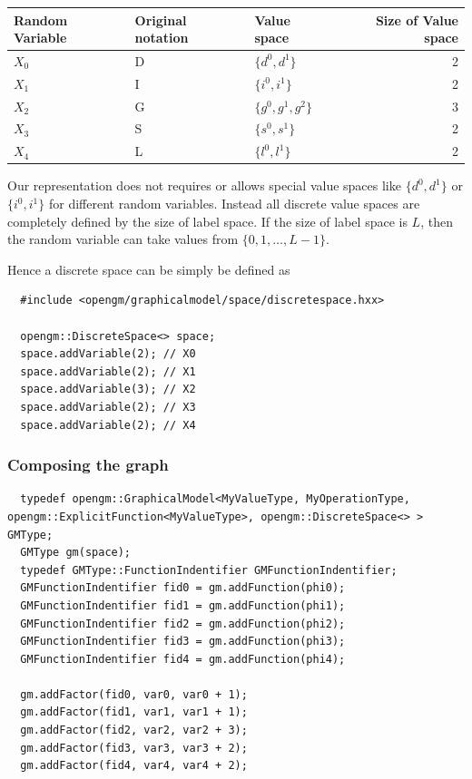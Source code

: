 \documentclass[12pt,oneside,letterpaper]{article}
\begin{document}
\begin{tabular}{|l|l|l|r|}
  \hline
  Random Variable & Original notation & Value space & Size of Value space \\
  \hline
  $X_0$ & D & $\{d^0, d^1\}$ & 2\\
  $X_1$ & I & $\{i^0, i^1\}$ & 2\\
  $X_2$ & G & $\{g^0, g^1, g^2\}$ & 3\\
  $X_3$ & S & $\{s^0, s^1\}$ & 2\\
  $X_4$ & L & $\{l^0, l^1\}$ & 2\\
  \hline
\end{tabular}

Our representation does not requires or allows special value spaces like
$\{d^0, d^1\}$ or $\{i^0, i^1\}$ for different random variables. 
Instead all discrete value spaces are completely defined by the size of label
space. If the size of label space is $L$, then the random variable can take
values from $\{0, 1, \dots, L - 1\}$.

Hence a discrete space can be simply be defined as 

\begin{lstlisting}
  #include <opengm/graphicalmodel/space/discretespace.hxx>

  opengm::DiscreteSpace<> space;
  space.addVariable(2); // X0
  space.addVariable(2); // X1
  space.addVariable(3); // X2
  space.addVariable(2); // X3
  space.addVariable(2); // X4
\end{lstlisting}

\subsubsection{Composing the graph}

\begin{lstlisting}
  typedef opengm::GraphicalModel<MyValueType, MyOperationType, opengm::ExplicitFunction<MyValueType>, opengm::DiscreteSpace<> > GMType;
  GMType gm(space);
  typedef GMType::FunctionIndentifier GMFunctionIndentifier;
  GMFunctionIndentifier fid0 = gm.addFunction(phi0);
  GMFunctionIndentifier fid1 = gm.addFunction(phi1);
  GMFunctionIndentifier fid2 = gm.addFunction(phi2);
  GMFunctionIndentifier fid3 = gm.addFunction(phi3);
  GMFunctionIndentifier fid4 = gm.addFunction(phi4);

  gm.addFactor(fid0, var0, var0 + 1);
  gm.addFactor(fid1, var1, var1 + 1);
  gm.addFactor(fid2, var2, var2 + 3);
  gm.addFactor(fid3, var3, var3 + 2);
  gm.addFactor(fid4, var4, var4 + 2);
\end{lstlisting}
\end{document}
